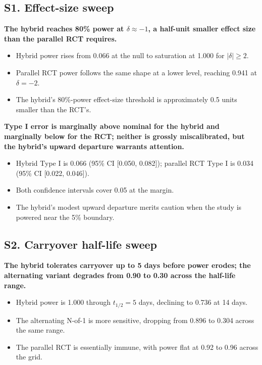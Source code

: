 \documentclass[
  11pt,
]{article}
\begin{document}
\subsection{S1. Effect-size sweep}\label{s1.-effect-size-sweep}

\textbf{The hybrid reaches 80\% power at $\delta \approx -1$, a half-unit smaller effect size than the parallel RCT requires.}

\begin{itemize}\setlength{\itemsep}{2pt}\setlength{\parskip}{0pt}
\item Hybrid power rises from 0.066 at the null to saturation at 1.000 for $|\delta| \geq 2$.
\item Parallel RCT power follows the same shape at a lower level, reaching 0.941 at $\delta = -2$.
\item The hybrid's 80\%-power effect-size threshold is approximately 0.5 units smaller than the RCT's.
\end{itemize}

\textbf{Type I error is marginally above nominal for the hybrid and marginally below for the RCT; neither is grossly miscalibrated, but the hybrid's upward departure warrants attention.}

\begin{itemize}\setlength{\itemsep}{2pt}\setlength{\parskip}{0pt}
\item Hybrid Type I is 0.066 (95\% CI [0.050, 0.082]); parallel RCT Type I is 0.034 (95\% CI [0.022, 0.046]).
\item Both confidence intervals cover 0.05 at the margin.
\item The hybrid's modest upward departure merits caution when the study is powered near the 5\% boundary.
\end{itemize}

\subsection{S2. Carryover half-life sweep}\label{s2.-carryover-half-life-sweep}

\textbf{The hybrid tolerates carryover up to 5 days before power erodes; the alternating variant degrades from 0.90 to 0.30 across the half-life range.}

\begin{itemize}\setlength{\itemsep}{2pt}\setlength{\parskip}{0pt}
\item Hybrid power is 1.000 through $t_{1/2} = 5$ days, declining to 0.736 at 14 days.
\item The alternating N-of-1 is more sensitive, dropping from 0.896 to 0.304 across the same range.
\item The parallel RCT is essentially immune, with power flat at 0.92 to 0.96 across the grid.
\end{itemize}
\end{document}
